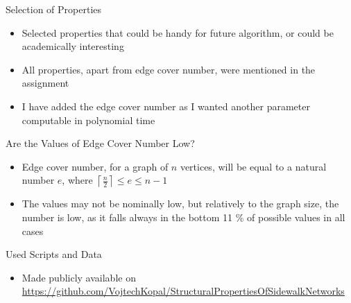 \documentclass{beamer}
\begin{document}
\begin{frame}{Selection of Properties}
    \begin{itemize}
        \item Selected properties that could be handy for future algorithm, or could be academically interesting
        \item All properties, apart from edge cover number, were mentioned in the assignment
        \item I have added the edge cover number as I wanted another parameter computable in polynomial time
    \end{itemize}
\end{frame}

\begin{frame}{Are the Values of Edge Cover Number Low?}
    \begin{itemize}
        \item Edge cover number, for a graph of $n$ vertices, will be equal to a natural number $e$, where $\left \lceil{\frac{n}{2}}\right \rceil  \leq e \leq n - 1$
        \item The values may not be nominally low, but relatively to the graph size, the number is low, as it falls always in the bottom 11 \% of possible values in all cases
    \end{itemize}
\begin{table}[h!]
\centering
{}
\end{table}
\end{frame}

\begin{frame}{Used Scripts and Data}
    \begin{itemize}
        \item Made publicly available on \url{https://github.com/VojtechKopal/StructuralPropertiesOfSidewalkNetworks}
    \end{itemize}
\end{frame}
\end{document}
